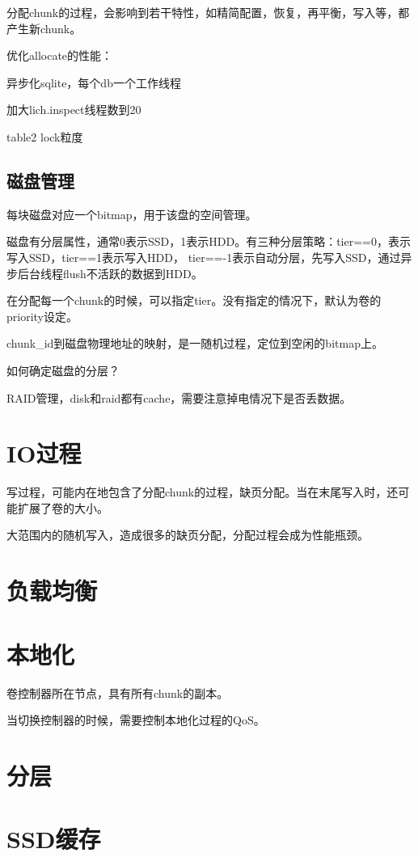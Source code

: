 分配chunk的过程，会影响到若干特性，如精简配置，恢复，再平衡，写入等，都产生新chunk。

优化allocate的性能：
\begin{compactitem}
\item 异步化sqlite，每个db一个工作线程
\item 加大lich.inspect线程数到20
\item table2 lock粒度 
\end{compactitem}

\subsection{磁盘管理}

每块磁盘对应一个bitmap，用于该盘的空间管理。

磁盘有分层属性，通常0表示SSD，1表示HDD。有三种分层策略：tier==0，表示写入SSD，tier==1表示写入HDD，
tier==-1表示自动分层，先写入SSD，通过异步后台线程flush不活跃的数据到HDD。

在分配每一个chunk的时候，可以指定tier。没有指定的情况下，默认为卷的priority设定。

chunk\_id到磁盘物理地址的映射，是一随机过程，定位到空闲的bitmap上。

如何确定磁盘的分层？

RAID管理，disk和raid都有cache，需要注意掉电情况下是否丢数据。

\section{IO过程}

写过程，可能内在地包含了分配chunk的过程，缺页分配。当在末尾写入时，还可能扩展了卷的大小。

大范围内的随机写入，造成很多的缺页分配，分配过程会成为性能瓶颈。

\section{负载均衡}

\section{本地化}

卷控制器所在节点，具有所有chunk的副本。

当切换控制器的时候，需要控制本地化过程的QoS。

\section{分层}

\section{SSD缓存}
